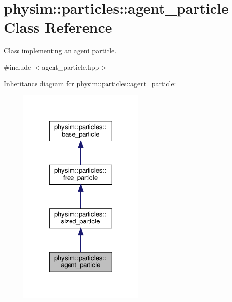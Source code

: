 \hypertarget{classphysim_1_1particles_1_1agent__particle}{}\section{physim\+:\+:particles\+:\+:agent\+\_\+particle Class Reference}
\label{classphysim_1_1particles_1_1agent__particle}


Class implementing an agent particle.  




{\ttfamily \#include $<$agent\+\_\+particle.\+hpp$>$}



Inheritance diagram for physim\+:\+:particles\+:\+:agent\+\_\+particle\+:\nopagebreak
\begin{figure}[H]
\begin{center}
\leavevmode
\includegraphics[width=177pt]{classphysim_1_1particles_1_1agent__particle__inherit__graph}
\end{center}
\end{figure}


